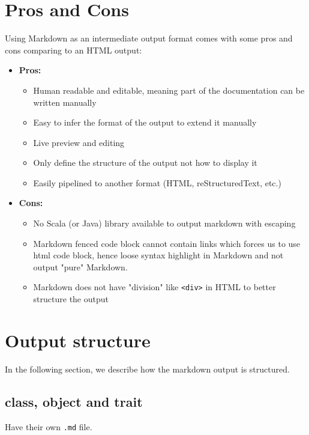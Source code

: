 \documentclass{report}
\begin{document}
\section{Pros and Cons}
\label{sec:proscons}
Using Markdown as an intermediate output format comes with some pros and cons comparing to an HTML output:
\begin{itemize}
    \item \textbf{Pros:}
    \begin{itemize}
        \item Human readable and editable, meaning part of the documentation can be written manually
        \item Easy to infer the format of the output to extend it manually
        \item Live preview and editing
        \item Only define the structure of the output not how to display it
        \item Easily pipelined to another format (HTML, reStructuredText, etc.)
    \end{itemize}
    \item \textbf{Cons:}
    \begin{itemize}
        \item No Scala (or Java) library available to output markdown with escaping
        \item Markdown fenced code block cannot contain links which forces us to use html code block, hence loose syntax highlight in Markdown and not output "pure" Markdown.
        \item Markdown does not have "division" like \texttt{<div>} in HTML to better structure the output
    \end{itemize}
\end{itemize}

\section{Output structure}
In the following section, we describe how the markdown output is structured.

\subsection{class, object and trait}
Have their own \texttt{.md} file.
\end{document}
